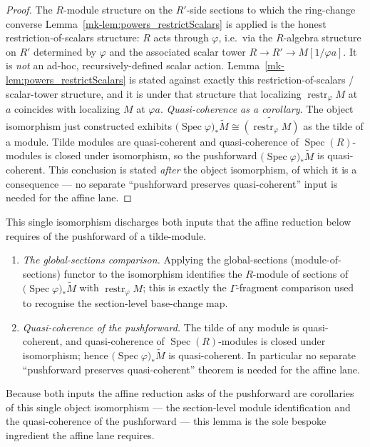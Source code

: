 \begin{proof}
  The \(R\)-module structure on the \(R'\)-side sections to which the ring-change
  converse Lemma~\ref{mk-lem:powers_restrictScalars} is applied is the honest
  restriction-of-scalars structure: \(R\) acts through \(\varphi\), i.e.\ via the
  \(R\)-algebra structure on \(R'\) determined by \(\varphi\) and the associated
  scalar tower \(R \to R' \to M[1/\varphi a]\). It is \emph{not} an ad-hoc,
  recursively-defined scalar action. Lemma~\ref{mk-lem:powers_restrictScalars} is
  stated against exactly this restriction-of-scalars / scalar-tower structure, and
  it is under that structure that localizing \(\operatorname{restr}_\varphi M\) at
  \(a\) coincides with localizing \(M\) at \(\varphi a\).
  \medskip
  \emph{Quasi-coherence as a corollary.} The object isomorphism just constructed
  exhibits \(\bigl(\operatorname{Spec}\varphi\bigr)_*\widetilde{M} \cong
  \widetilde{(\operatorname{restr}_\varphi M)}\) as the tilde of a module. Tilde
  modules are quasi-coherent and quasi-coherence of \(\operatorname{Spec}(R)\)-modules
  is closed under isomorphism, so the pushforward
  \(\bigl(\operatorname{Spec}\varphi\bigr)_*\widetilde{M}\) is quasi-coherent. This
  conclusion is stated \emph{after} the object isomorphism, of which it is a
  consequence — no separate ``pushforward preserves quasi-coherent'' input is
  needed for the affine lane.
\end{proof}

\begin{remark}
  This single isomorphism discharges both inputs that the affine reduction below
  requires of the pushforward of a tilde-module.
  \begin{enumerate}
    \item \emph{The global-sections comparison.} Applying the global-sections
      (module-of-sections) functor to the isomorphism identifies the
      \(R\)-module of sections of
      \(\bigl(\operatorname{Spec}\varphi\bigr)_*\widetilde{M}\) with
      \(\operatorname{restr}_\varphi M\); this is exactly the \(\Gamma\)-fragment
      comparison used to recognise the section-level base-change map.
    \item \emph{Quasi-coherence of the pushforward.} The tilde of any module is
      quasi-coherent, and quasi-coherence of \(\operatorname{Spec}(R)\)-modules is
      closed under isomorphism; hence
      \(\bigl(\operatorname{Spec}\varphi\bigr)_*\widetilde{M}\) is quasi-coherent.
      In particular no separate ``pushforward preserves quasi-coherent'' theorem is
      needed for the affine lane.
  \end{enumerate}
  Because both inputs the affine reduction asks of the pushforward are corollaries
  of this single object isomorphism — the section-level module identification and
  the quasi-coherence of the pushforward — this lemma is the sole bespoke
  ingredient the affine lane requires.
\end{remark}

